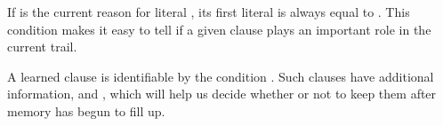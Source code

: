 If  is the current reason for literal , its first literal
 is always equal to . This condition makes
it easy
to tell if a given clause plays an important role in the current trail.

A learned clause is identifiable by the condition .
Such clauses have additional information,
 and ,
which will help us decide whether
or not to keep them after memory has begun to fill up.

